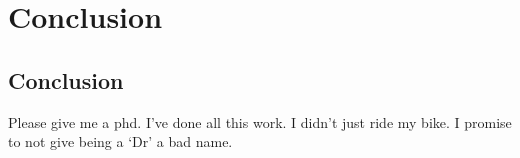 \chapter{Conclusion}

\ifpdf
    \graphicspath{{Chapter10/Figs/Raster/}{Chapter10/Figs/PDF/}{Chapter10/Figs/}}
\else
    \graphicspath{{Chapter10/Figs/Vector/}{Chapter10/Figs/}}
\fi


\section{Conclusion}  %

Please give me a phd. I've done all this work. I didn't just ride my bike.
I promise to not give being a `Dr' a bad name.